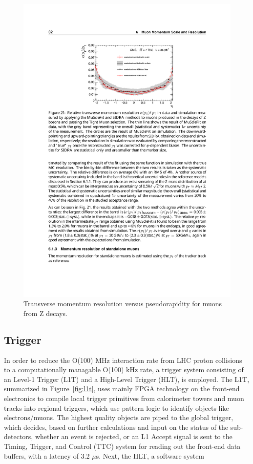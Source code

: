 \begin{figure}[tbh]
\centering
\includegraphics[width=5in]{figures/muonres.pdf}
\caption{Transverse momentum resolution versus pseudorapidity for muons from Z decays.}
\label{fig:muonres}
\end{figure}

\subsection{Trigger}

In order to reduce the O(100) MHz interaction rate from LHC proton collisions to a computationally managable O(100) kHz rate, a trigger system consisting of an Level-1 Trigger (L1T) and a High-Level Trigger (HLT), is employed. The L1T, summarized in Figure~\ref{fig:l1t}, uses mainly FPGA technology on the front-end electronics to compile local trigger primitives from calorimeter towers and muon tracks into regional triggers, which use pattern logic to identify objects like electrons/muons. The highest quality objects are piped to the global trigger, which decides, based on further calculations and input on the status of the sub-detectors, whether an event is rejected, or an L1 Accept signal is sent to the Timing, Trigger, and Control (TTC) system for reading out the front-end data buffers, with a latency of 3.2 $\mu$s. Next, the HLT, a software system

